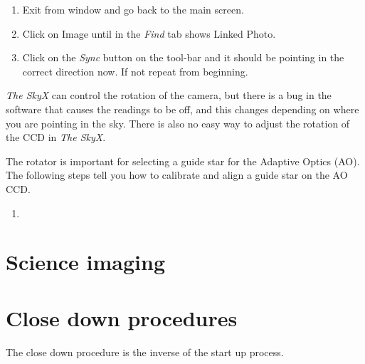 \documentclass[12pt,twoside,a4paper]{report}
\begin{document}
\begin{enumerate}
 \item Exit from window and go back to the main screen.
 \item Click on Image until in the \emph{Find} tab shows Linked Photo.
 \item Click on the \emph{Sync} button on the tool-bar and it should be pointing in the correct direction now. If not repeat from beginning.
\end{enumerate}

\emph{The SkyX} can control the rotation of the camera, but there is a bug in the software that causes the readings to be off, and this changes depending on where you are pointing in the sky. There is also no easy way to adjust the rotation of the CCD in \emph{The SkyX}.

The rotator is important for selecting a guide star for the Adaptive Optics (AO). The following steps tell you how to calibrate and align a guide star on the AO CCD.
\begin{enumerate}
 \item 
\end{enumerate}







\vfill \eject 

\section{Science imaging}

\vfill \eject

\section{Close down procedures}

The close down procedure is the inverse of the start up process.
\end{document}
